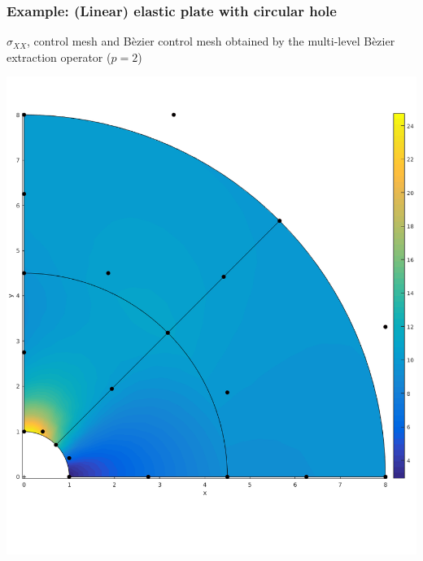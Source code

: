 \documentclass{beamer}
\begin{document}
\begin{frame}
	\frametitle{Example: (Linear) elastic plate with circular hole }%
	$ \sigma_{XX} $, control mesh and B\`ezier control mesh obtained by the multi-level B\`ezier extraction operator ($ p=2 $)\\
	\centering
	\begin{minipage}{0.49\textwidth}
		\centering
		\includegraphics[scale=0.24]{pics/plateWithAHole/plate_beziernet_1.png}
	\end{minipage}
	\begin{minipage}{0.49\textwidth}
		\centering

\end{minipage}
\end{frame}
\end{document}
